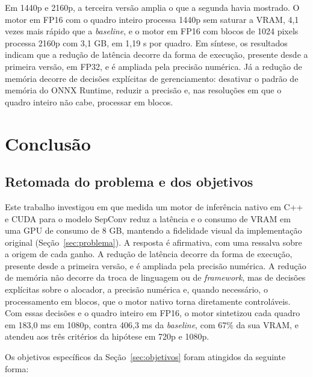 \documentclass[
    12pt,                %
    openright,           %
    oneside,             %
    a4paper,             %
    english,             %
    brazil               %
]{abntex2}
\begin{document}
Em 1440p e 2160p, a terceira versão amplia o que a segunda havia mostrado. O motor em FP16 com o quadro inteiro processa 1440p sem saturar a VRAM, 4,1 vezes mais rápido que a \textit{baseline}, e o motor em FP16 com blocos de 1024 pixels processa 2160p com 3,1 GB, em 1,19 s por quadro. Em síntese, os resultados indicam que a redução de latência decorre da forma de execução, presente desde a primeira versão, em FP32, e é ampliada pela precisão numérica. Já a redução de memória decorre de decisões explícitas de gerenciamento: desativar o padrão de memória do ONNX Runtime, reduzir a precisão e, nas resoluções em que o quadro inteiro não cabe, processar em blocos.

\chapter{Conclusão}
\label{cap:conclusao}

\section{Retomada do problema e dos objetivos}
\label{sec:retomada}

Este trabalho investigou em que medida um motor de inferência nativo em C++ e CUDA para o modelo SepConv reduz a latência e o consumo de VRAM em uma GPU de consumo de 8 GB, mantendo a fidelidade visual da implementação original (Seção~\ref{sec:problema}). A resposta é afirmativa, com uma ressalva sobre a origem de cada ganho. A redução de latência decorre da forma de execução, presente desde a primeira versão, e é ampliada pela precisão numérica. A redução de memória não decorre da troca de linguagem ou de \textit{framework}, mas de decisões explícitas sobre o alocador, a precisão numérica e, quando necessário, o processamento em blocos, que o motor nativo torna diretamente controláveis. Com essas decisões e o quadro inteiro em FP16, o motor sintetizou cada quadro em 183,0 ms em 1080p, contra 406,3 ms da \textit{baseline}, com 67\% da sua VRAM, e atendeu aos três critérios da hipótese em 720p e 1080p.

Os objetivos específicos da Seção~\ref{sec:objetivos} foram atingidos da seguinte forma:
\end{document}
